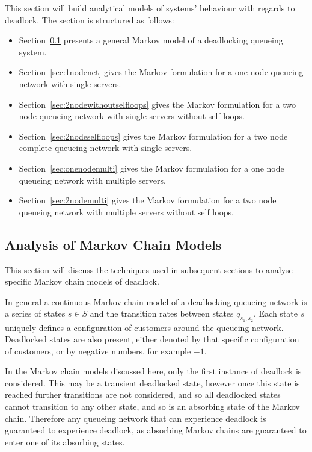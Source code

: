 \documentclass{article}
\begin{document}
This section will build analytical models of systems' behaviour with regards to deadlock.
The section is structured as follows:
\begin{itemize}
  \item Section~\ref{sec:analysisMC} presents a general Markov model of a deadlocking queueing system.
  \item Section~\ref{sec:1nodenet} gives the Markov formulation for a one node queueing network with single servers.
  \item Section~\ref{sec:2nodewithoutselfloops} gives the Markov formulation for a two node queueing network with single servers without self loops.
  \item Section~\ref{sec:2nodeselfloops} gives the Markov formulation for a two node complete queueing network with single servers.
  \item Section~\ref{sec:onenodemulti} gives the Markov formulation for a one node queueing network with multiple servers.
  \item Section~\ref{sec:2nodemulti} gives the Markov formulation for a two node queueing network with multiple servers without self loops.
\end{itemize}

\subsection{Analysis of Markov Chain Models}\label{sec:analysisMC}

This section will discuss the techniques used in subsequent sections to analyse specific Markov chain models of deadlock.

In general a continuous Markov chain model of a deadlocking queueing network is a series of states $s \in S$ and the transition rates between states $q_{s_1,s_2}$.
Each state $s$ uniquely defines a configuration of customers around the queueing network.
Deadlocked states are also present, either denoted by that specific configuration of customers, or by negative numbers, for example $-1$.

In the Markov chain models discussed here, only the first instance of deadlock is considered.
This may be a transient deadlocked state, however once this state is reached further transitions are not considered, and so all deadlocked states cannot transition to any other state, and so is an absorbing state of the Markov chain.
Therefore any queueing network that can experience deadlock is guaranteed to experience deadlock, as absorbing Markov chains are guaranteed to enter one of its absorbing states.
\end{document}
